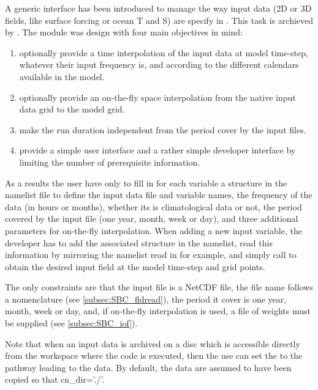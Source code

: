\documentclass[../tex_main/NEMO_manual]{subfiles}
\begin{document}
A generic interface has been introduced to manage the way input data
(2D or 3D fields, like surface forcing or ocean T and S) are specify in \NEMO.
This task is archieved by .
The module was design with four main objectives in mind: 
\begin{enumerate}
\item
  optionally provide a time interpolation of the input data at model time-step, whatever their input frequency is,
  and according to the different calendars available in the model.
\item
  optionally provide an on-the-fly space interpolation from the native input data grid to the model grid.
\item
  make the run duration independent from the period cover by the input files.
\item
  provide a simple user interface and a rather simple developer interface by
  limiting the number of prerequisite information. 
\end{enumerate}  

As a results the user have only to fill in for each variable a structure in the namelist file to
define the input data file and variable names, the frequency of the data (in hours or months),
whether its is climatological data or not, the period covered by the input file (one year, month, week or day),
and three additional parameters for on-the-fly interpolation.
When adding a new input variable, the developer has to add the associated structure in the namelist,
read this information by mirroring the namelist read in  for example,
and simply call  to obtain the desired input field at the model time-step and grid points.

The only constraints are that the input file is a NetCDF file, the file name follows a nomenclature 
(see \autoref{subsec:SBC_fldread}), the period it cover is one year, month, week or day, and,
if on-the-fly interpolation is used, a file of weights must be supplied (see \autoref{subsec:SBC_iof}).

Note that when an input data is archived on a disc which is accessible directly from the workspace where
the code is executed, then the use can set the  to the pathway leading to the data.
By default, the data are assumed to have been copied so that cn\_dir='./'.

\end{document}
